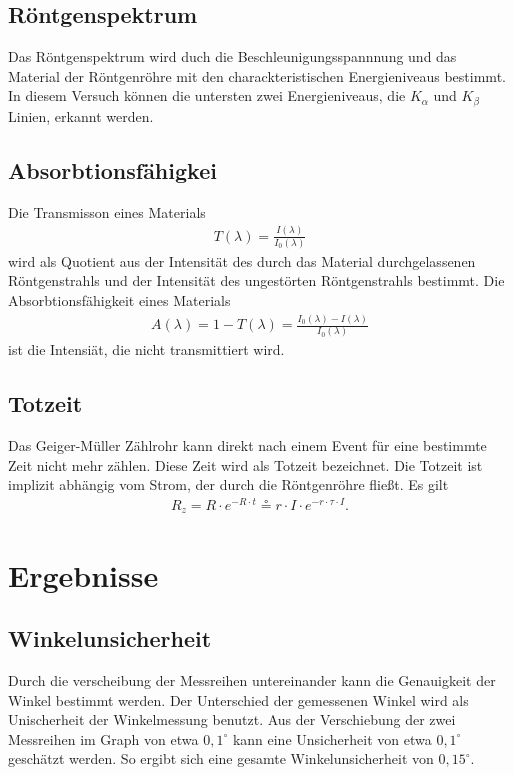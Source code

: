 \documentclass[11pt, a4paper]{article}
\begin{document}
    \subsection{Röntgenspektrum}

    Das Röntgenspektrum wird duch die Beschleunigungsspannnung und das Material der Röntgenröhre mit den charackteristischen Energieniveaus bestimmt. In diesem Versuch können die untersten zwei Energieniveaus, die $K_{\alpha}$ und $K_{\beta}$ Linien, erkannt werden.
    \subsection{Absorbtionsfähigkei}

    Die Transmisson eines Materials
    \begin{align}
        T(\lambda) = \frac{I(\lambda)}{I_{0}(\lambda)} \label{eq:transmission}
    \end{align}
    wird als Quotient aus der Intensität des durch das Material durchgelassenen Röntgenstrahls und der Intensität des ungestörten Röntgenstrahls bestimmt. Die Absorbtionsfähigkeit eines Materials
    \begin{align}
        A(\lambda) = 1 - T(\lambda) = \frac{I_{0}(\lambda) - I(\lambda)}{I_{0}(\lambda)}
    \end{align}
    ist die Intensiät, die nicht transmittiert wird.

    \subsection{Totzeit}
    Das Geiger-Müller Zählrohr kann direkt nach einem Event für eine bestimmte Zeit nicht mehr zählen. Diese Zeit wird als Totzeit bezeichnet. Die Totzeit ist implizit abhängig vom Strom, der durch die Röntgenröhre fließt. Es gilt
    \begin{align}
        R_{z} = R \cdot e^{-R \cdot t} \circeq r \cdot I \cdot e^{-r \cdot \tau \cdot I}. \label{eq:totzeit}
    \end{align}

    \section{Ergebnisse}

    \subsection{Winkelunsicherheit}
    Durch die verscheibung der Messreihen untereinander kann die Genauigkeit der Winkel bestimmt werden. Der Unterschied der gemessenen Winkel wird als Unischerheit der Winkelmessung benutzt. Aus der Verschiebung der zwei Messreihen im Graph von etwa $0,1^{\circ}$ kann eine Unsicherheit von etwa $0,1^{\circ}$ geschätzt werden. So ergibt sich eine gesamte Winkelunsicherheit von $0,15^{\circ}$.
\end{document}
